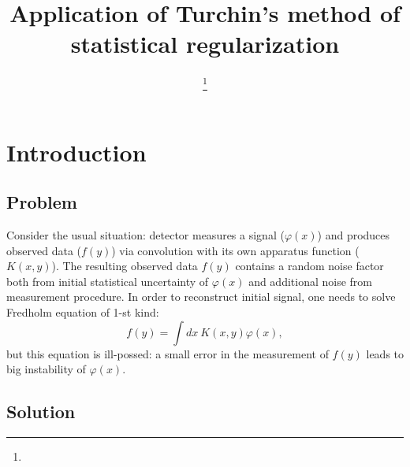 \documentclass{webofc}
\begin{document}
\title{Application of Turchin's method of statistical regularization}
\author{ \fnsep\thanks{} \and
      
    }
%
%
\maketitle

\section{Introduction}

\subsection{Problem}

Consider the usual situation: detector measures a signal ($\varphi(x)$) and produces observed data ($f(y)$) via convolution with its own apparatus function ($K(x,y)$). The resulting observed data $f(y)$ contains a random noise factor both from initial statistical uncertainty of $\varphi(x)$ and additional noise from measurement procedure. In order to reconstruct initial signal, one needs to solve Fredholm equation of 1-st kind:
\begin{equation}
\label{eq-01}
    f(y) = \int dx~ K(x,y)\varphi(x),
\end{equation}
but this equation is ill-possed: a small error in the measurement of $f(y)$ leads to big instability of $\varphi(x)$. 

\subsection{Solution}
\end{document}
